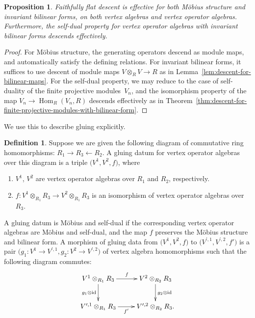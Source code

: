 \documentclass[pdftex]{sigma}
\DeclareMathOperator{\Hom}{Hom}
\newtheorem{prop}[thm]{Proposition}
\theoremstyle{definition}
\newtheorem{defn}[thm]{Definition}
\begin{document}
\begin{prop} \label{prop:faithfully-flat-descent-for-Mobius-forms-and-self-duality}Faithfully flat descent is effective for both M\"obius structure and invariant bilinear forms, on both vertex algebras and vertex operator algebras. Furthermore, the self-dual property for vertex operator algebras with invariant bilinear forms descends effectively.
\end{prop}
\begin{proof}For M\"obius structure, the generating operators descend as module maps, and automatically satisfy the defining relations. For invariant bilinear forms, it suffices to use descent of module maps $V \otimes_{R} V \to R$ as in Lemma~\ref{lem:descent-for-bilinear-maps}. For the self-dual property, we may reduce to the case of self-duality of the finite projective modules~$V_n$, and the isomorphism property of the map $V_n \to \Hom_R(V_n,R)$ descends effectively as in Theorem~\ref{thm:descent-for-finite-projective-modules-with-bilinear-form}.
\end{proof}

We use this to describe gluing explicitly.

\begin{defn}Suppose we are given the following diagram of commutative ring homomorphisms: $R_1 \to R_3 \leftarrow R_2$. A gluing datum for vertex operator algebras over this diagram is a triple $\big(V^1, V^2, f\big)$, where
\begin{enumerate}\itemsep=0pt
\item $V^1$, $V^2$ are vertex operator algebras over $R_1$ and $R_2$, respectively.
\item $f\colon V^1 \otimes_{R_1} R_3 \to V^2 \otimes_{R_1} R_3$ is an isomorphism of vertex operator algebras over $R_3$.
\end{enumerate}
A gluing datum is M\"obius and self-dual if the corresponding vertex operator algebras are M\"obius and self-dual, and the map $f$ preserves the M\"obius structure and bilinear form. A morphism of gluing data from $\big(V^1, V^2, f\big)$ to $\big(V^{\prime,1}, V^{\prime,2}, f'\big)$ is a pair $\big(g_1\colon V^1 \to V^{\prime,1}, g_2\colon V^2 \to V^{\prime,2}\big)$ of vertex algebra homomorphisms such that the following diagram commutes:
\begin{gather*} \xymatrix{ V^1 \otimes_{R_1} R_3 \ar[r]^-{f} \ar[d]_{g_1 \otimes {\rm id}} & V^2 \otimes_{R_2} R_3 \ar[d]^{g_2 \otimes {\rm id}} \\ V^{\prime,1} \otimes_{R_1} R_3 \ar[r]_-{f'} & V^{\prime,2} \otimes_{R_2} R_3. } \end{gather*}
\end{defn}
\end{document}
